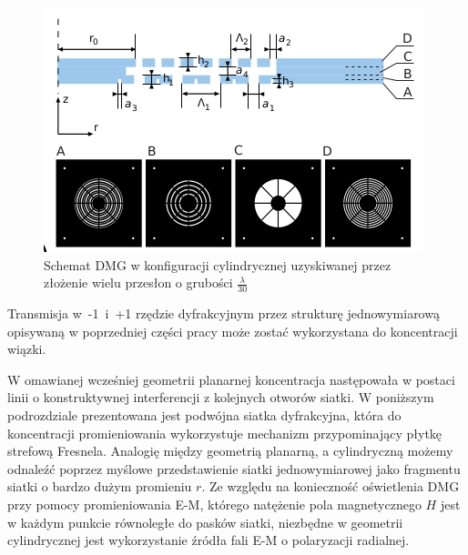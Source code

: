 \begin{figure}
	\includegraphics[width=\textwidth]{images/dmg/express_siatki.png}
	\caption{Schemat DMG w konfiguracji cylindrycznej uzyskiwanej przez złożenie wielu przesłon o grubości $\frac{\lambda}{30}$ \cite{Yavorskiy:14}}
	\label{fig:schem-cyl}
\end{figure}

Transmisja w~-1~i~+1 rzędzie dyfrakcyjnym przez strukturę jednowymiarową opisywaną w poprzedniej części pracy może zostać wykorzystana do koncentracji wiązki. 

W omawianej wcześniej geometrii planarnej koncentracja następowała w postaci linii o konstruktywnej interferencji z kolejnych otworów siatki. W poniższym podrozdziale prezentowana jest podwójna siatka dyfrakcyjna, która do koncentracji promieniowania wykorzystuje mechanizm przypominający płytkę strefową Fresnela. Analogię między geometrią planarną, a cylindryczną możemy odnaleźć poprzez myślowe przedstawienie siatki jednowymiarowej jako fragmentu siatki o bardzo dużym promieniu $r$. Ze względu na konieczność oświetlenia DMG przy pomocy promieniowania E-M, którego natężenie pola magnetycznego $H$ jest w każdym punkcie równoległe do pasków siatki, niezbędne w geometrii cylindrycznej jest wykorzystanie źródła fali E-M o polaryzacji radialnej. 


